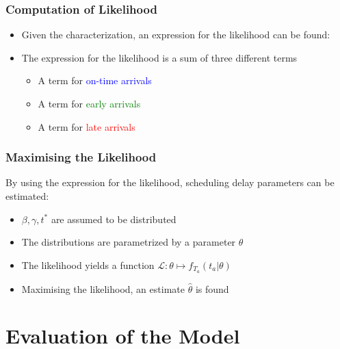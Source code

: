 \documentclass[hyperref={pdfpagelabels=false}]{beamer}
\begin{document}
\begin{frame}
  \frametitle{Computation of Likelihood}
  \begin{itemize}
  \item Given the characterization, an expression for the likelihood can be found:
  \item<2-> The expression for the likelihood is a sum of three different terms
    \begin{itemize}
    \item<2-> A term for \textcolor{blue}{on-time arrivals}
    \item<2-> A term for \textcolor{green}{early arrivals}
    \item<2-> A term for \textcolor{red}{late arrivals}
    \end{itemize}
  \end{itemize}
\end{frame}

\begin{frame}
  \frametitle{Maximising the Likelihood}
  By using the expression for the likelihood,
  scheduling delay parameters can be estimated:
  \begin{itemize}
  \item \(\beta, \gamma, t^*\) are assumed to be distributed
  \item The distributions are parametrized by a parameter \(\theta\)
  \item The likelihood yields a function \(\mathcal{L} : \theta \mapsto f_{T_a}(t_a | \theta)\)
  \item Maximising the likelihood, an estimate \(\hat{\theta}\) is found
  \end{itemize}
\end{frame}

\section{Evaluation of the Model}
\end{document}
